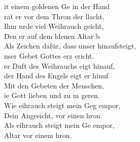 
it einem goldenen Ge in der Hand\\
rat er vor dem Thron der llacht.\\
Ihm urde viel Weihrauch geicht,\\
Den er auf dem ldenen Altar b\\
Als Zeichen dafür, dass unser  hinaufsteigt,\\
nser Gebet Gottes erz ericht. \\

er Duft des Weihrauchs eigt hinauf,\\
 der Hand des Engels eigt er hinuf\\
Mit den Gebeten  der Menschen,\\
ie Gott lieben und zu m geren.\\

Wie eihrauch steigt mein Geg empor,\\
 Dein Angesicht, vor einen hron.\\
Als eihrauch steigt mein Ge empor,\\
 Altar vor einem hron.

